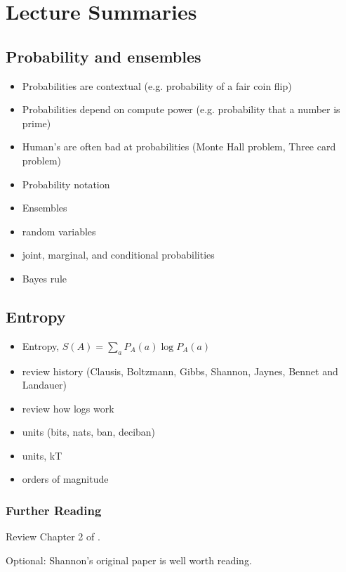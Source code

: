 \documentclass[Lectures.tex]{subfiles}
\begin{document}
\section{Lecture Summaries}

\subsection{Probability and ensembles}
\begin{itemize}
\item Probabilities are contextual (e.g. probability of a fair coin flip)
\item Probabilities depend on compute power (e.g. probability that a number is prime) 
\item Human's are often bad at probabilities (Monte Hall problem, Three card problem)
\item Probability notation
\item Ensembles
\item random variables
\item joint, marginal, and conditional probabilities
\item Bayes rule
\end{itemize}

\subsection{Entropy}
\begin{itemize}
\item Entropy, $S(A) = \sum_a P_A(a) \log P_A(a)$
\item review history (Clausis, Boltzmann, Gibbs, Shannon, Jaynes, Bennet and Landauer)
\item review how logs work
\item units (bits, nats, ban, deciban)
\item units, kT
\item orders of magnitude
\end{itemize}

\subsubsection*{Further Reading}
Review Chapter 2 of .

\noindent
Optional: Shannon's original paper is well worth reading. ~\cite{Shannon1948a}

 
\end{document}

